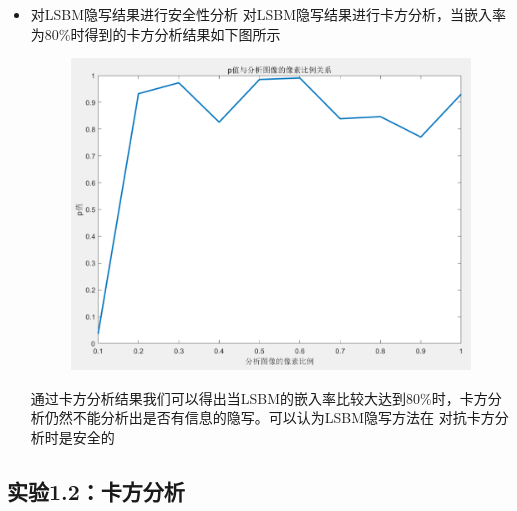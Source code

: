 \documentclass[a4paper,11pt,UTF8]{ctexart}
\newcommand{\bottomcaption}{%
\setlength{\abovecaptionskip}{6pt}%
\setlength{\belowcaptionskip}{6pt}%
\caption}
\newcommand{\xiaowuhao}{\fontsize{9pt}{\baselineskip}\selectfont}   %
\begin{document}
\begin{itemize}
      \item 对LSBM隐写结果进行安全性分析
        对LSBM隐写结果进行卡方分析，当嵌入率为80\%时得到的卡方分析结果如下图所示\par
        \begin{figure}[H]
          \centering
          \includegraphics[width=11cm]{k2_LSBM_80.png}
          \bottomcaption{\xiaowuhao{对嵌入率为80\%的LSBM隐写图像卡方分析结果}}
        \end{figure}
        通过卡方分析结果我们可以得出当LSBM的嵌入率比较大达到80\%时，卡方分析仍然不能分析出是否有信息的隐写。可以认为LSBM隐写方法在
        对抗卡方分析时是安全的
    \end{itemize}

  \subsection{实验1.2：卡方分析}
\end{document}
